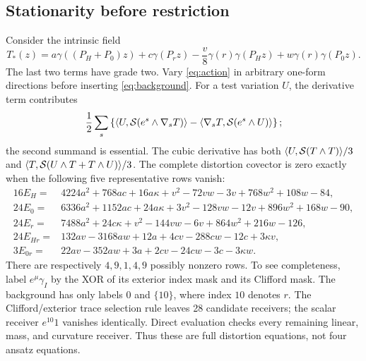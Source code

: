 \subsection{Stationarity before restriction}
Consider the intrinsic field
\begin{equation}
 T_*(z)=a\gamma((P_H+P_0)z)+c\gamma(P_rz)
 -\frac v8\gamma(r)\gamma(P_Hz)+w\gamma(r)\gamma(P_0z).
 \label{eq:background}
\end{equation}
The last two terms have grade two. Vary \eqref{eq:action} in arbitrary
one-form directions before inserting \eqref{eq:background}.
For a test variation $U$, the derivative term contributes
\begin{equation}
 \frac12\sum_s\left\{
 \langle U,\mathcal S(e^s\wedge\nabla_sT)\rangle
 -\langle\nabla_sT,\mathcal S(e^s\wedge U)\rangle\right\};
 \label{eq:formal-adjoint}
\end{equation}
the second summand is essential. The cubic derivative has both
$\langle U,\mathcal S(T\wedge T)\rangle/3$ and
$\langle T,\mathcal S(U\wedge T+T\wedge U)\rangle/3$.
The complete distortion covector is zero exactly when the following
five representative rows vanish:
\begin{align}
16E_H={}&4224a^2+768ac+16a\kappa+v^2-72vw-3v
                   +768w^2+108w-84,\nonumber\\
24E_0={}&6336a^2+1152ac+24a\kappa+3v^2-128vw-12v
                   +896w^2+168w-90,\nonumber\\
24E_r={}&7488a^2+24c\kappa+v^2-144vw-6v
                   +864w^2+216w-126,\label{eq:stationary}\\
24E_{Hr}={}&132av-3168aw+12a+4cv-288cw-12c+3\kappa v,
 \nonumber\\
3E_{0r}={}&22av-352aw+3a+2cv-24cw-3c-3\kappa w.\nonumber
\end{align}
There are respectively $4,9,1,4,9$ possibly nonzero rows.
To see completeness, label $e^\mu\gamma_I$ by the XOR of its exterior
index mask and its Clifford mask. The background has only labels $0$
and $\{10\}$, where index $10$ denotes $r$.
The Clifford/exterior trace selection rule leaves 28 candidate receivers;
the scalar receiver $e^{10}1$ vanishes identically. Direct evaluation
checks every remaining linear, mass, and curvature receiver. Thus these
are full distortion equations, not four ansatz equations.

